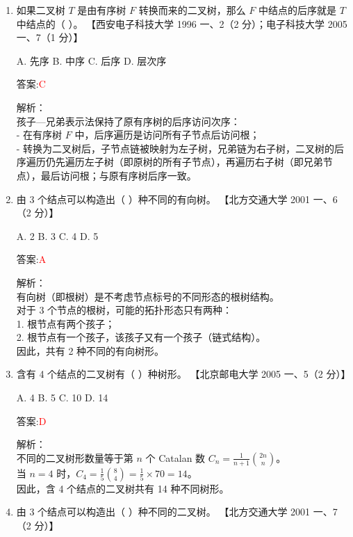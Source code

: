 \documentclass[lang=cn,newtx,10pt,scheme=chinese]{../../../elegantbook}
\begin{document}
\begin{enumerate}
\item 如果二叉树 $T$ 是由有序树 $F$ 转换而来的二叉树，那么 $F$ 中结点的后序就是 $T$ 中结点的（ ）。  
    【西安电子科技大学 1996 一、2（2 分）；电子科技大学 2005 一、7（1 分）】

    A. 先序  
    B. 中序  
    C. 后序  
    D. 层次序

    答案:\textcolor{red}{C}

    解析：\\
    孩子—兄弟表示法保持了原有序树的后序访问次序：\\
    - 在有序树 $F$ 中，后序遍历是访问所有子节点后访问根；\\
    - 转换为二叉树后，子节点链被映射为左子树，兄弟链为右子树，二叉树的后序遍历仍先遍历左子树（即原树的所有子节点），再遍历右子树（即兄弟节点），最后访问根；与原有序树后序一致。\\


    \item 由 3 个结点可以构造出（ ）种不同的有向树。  
    【北方交通大学 2001 一、6（2 分）】

    A. 2  
    B. 3  
    C. 4  
    D. 5

    答案:\textcolor{red}{A}

    解析：\\
    有向树（即根树）是不考虑节点标号的不同形态的根树结构。\\
    对于 3 个节点的根树，可能的拓扑形态只有两种：\\
    1. 根节点有两个孩子；\\
    2. 根节点有一个孩子，该孩子又有一个孩子（链式结构）。\\
    因此，共有 2 种不同的有向树形。\\

\item 含有 4 个结点的二叉树有（ ）种树形。  
    【北京邮电大学 2005 一、5（2 分）】

    A. 4  
    B. 5  
    C. 10  
    D. 14

    答案:\textcolor{red}{D}

    解析：\\
    不同的二叉树形数量等于第 $n$ 个 Catalan 数 $C_n = \frac{1}{n+1}\binom{2n}{n}$。\\
    当 $n=4$ 时，$C_4 = \frac{1}{5}\binom{8}{4} = \frac{1}{5} \times 70 = 14$。\\
    因此，含 4 个结点的二叉树共有 14 种不同树形。\\

\item 由 3 个结点可以构造出（ ）种不同的二叉树。  
    【北方交通大学 2001 一、7（2 分）】


\end{enumerate}
\end{document}
